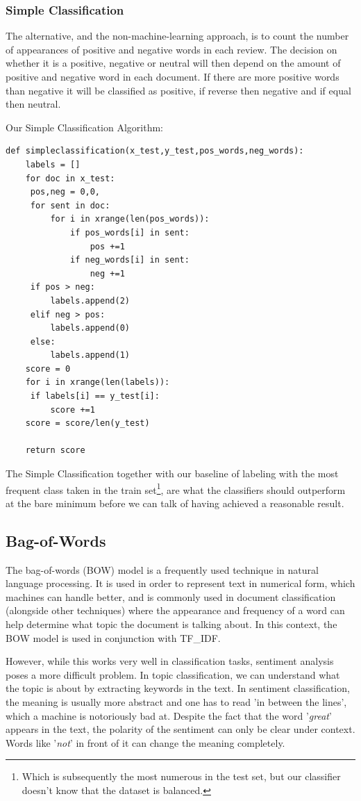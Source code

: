 \documentclass{article}
\begin{document}
\subsubsection{Simple Classification}

The alternative, and the non-machine-learning approach, is to count the number of appearances of positive and negative words in each review. The decision on whether it is a positive, negative or neutral will then depend on the amount of positive and negative word in each document. If there are more positive words than negative it will be classified as positive, if reverse then negative and if equal then neutral.  

Our Simple Classification Algorithm:

\begin{lstlisting}
def simpleclassification(x_test,y_test,pos_words,neg_words):
    labels = []
    for doc in x_test:
   	 pos,neg = 0,0,
   	 for sent in doc:
   		 for i in xrange(len(pos_words)):
   			 if pos_words[i] in sent:
   				 pos +=1
   			 if neg_words[i] in sent:
   				 neg +=1
   	 if pos > neg:
   		 labels.append(2)
   	 elif neg > pos:
   		 labels.append(0)
   	 else:
   		 labels.append(1)
    score = 0
    for i in xrange(len(labels)):
   	 if labels[i] == y_test[i]:
   		 score +=1
    score = score/len(y_test)

    return score
\end{lstlisting}

The Simple Classification together with our baseline of labeling with the most frequent class taken in the train set\footnote{Which is subsequently the most numerous in the test set, but our classifier doesn't know that the dataset is balanced.}, are what the classifiers should outperform at the bare minimum before we can talk of having achieved a reasonable result.  

\subsection{Bag-of-Words}
The bag-of-words (BOW) model is a frequently used technique in natural language processing. It is used in order to represent text in numerical form, which machines can handle better, and is commonly used in document classification (alongside other techniques) where the appearance and frequency of a word can help determine what topic the document is talking about. In this context, the BOW model is used in conjunction with TF\_IDF.

However, while this works very well in classification tasks, sentiment analysis poses a more difficult problem. In topic classification, we can understand what the topic is about by extracting keywords in the text. In sentiment classification, the meaning is usually more abstract and one has to read 'in between the lines', which a machine is notoriously bad at. Despite the fact that the word '\textit{great}' appears in the text, the polarity of the sentiment can only be clear under context. Words like '\textit{not}' in front of it can change the meaning completely.
\end{document}
